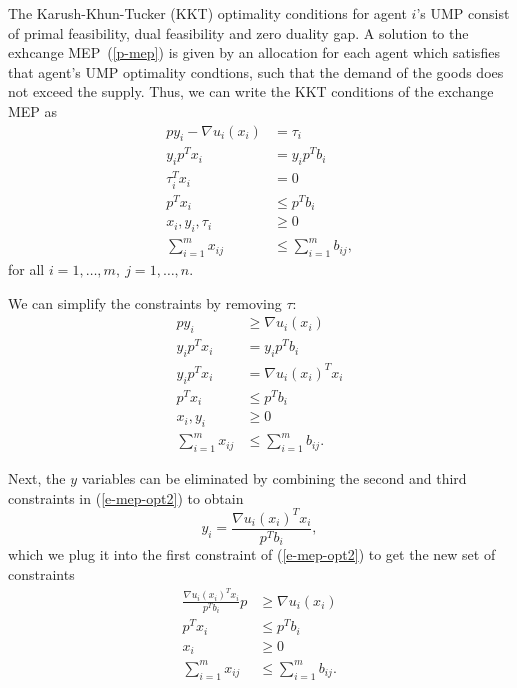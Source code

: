 \documentclass[12pt]{article}
\begin{document}
The Karush-Khun-Tucker (KKT) optimality conditions for agent $i$'s UMP consist of primal feasibility, dual
feasibility and zero duality gap.
A solution to the exhcange MEP~(\ref{p-mep})
is given by an allocation for each agent which satisfies that
agent's UMP optimality condtions, such that the demand of the goods
does not exceed the supply.
Thus, we can write the KKT conditions of the exchange MEP as
\begin{equation}
\begin{aligned}
p y_i - \nabla u_i(x_i)&= \tau_i\\
y_i p^T x_i &= y_i p^T b_i\\
\tau_i^T x_i &= 0\\
p^T x_i &\leq p^T b_i\\
x_i, y_i, \tau_i &\geq 0\\
\sum_{i=1}^m x_{ij} &\leq \sum_{i=1}^m b_{ij},
\end{aligned}
\label{e-mep-opt1}
\end{equation}
for all $i=1,\ldots,m,\ j=1,\ldots,n$.

We can simplify the constraints by removing $\tau$:
\begin{equation}
\begin{aligned}
p y_i &\geq \nabla u_i(x_i) \\
y_i p^T x_i &= y_i p^T b_i \\
y_i p^T x_i &= \nabla u_i(x_i)^T x_i\\
p^T x_i &\leq p^T b_i\\
x_i, y_i &\geq 0\\
\sum_{i=1}^m x_{ij} &\leq \sum_{i=1}^m b_{ij}.
\end{aligned}
\label{e-mep-opt2}
\end{equation}

Next, the $y$ variables can be eliminated by combining the second and third constraints in (\ref{e-mep-opt2})
to obtain
\[
y_i = \frac{\nabla u_i(x_i)^T x_i}{p^T b_i},
\]
which we plug it into the first constraint of (\ref{e-mep-opt2}) to get the new set of constraints
\begin{equation}
\begin{aligned}
\frac{\nabla u_i(x_i)^T x_i}{p^T b_i} p &\geq \nabla u_i(x_i) \\
p^T x_i &\leq p^T b_i\\
x_i &\geq 0\\
\sum_{i=1}^m x_{ij} &\leq \sum_{i=1}^m b_{ij}.
\end{aligned}
\label{e-mep-opt3}
\end{equation}
\end{document}
